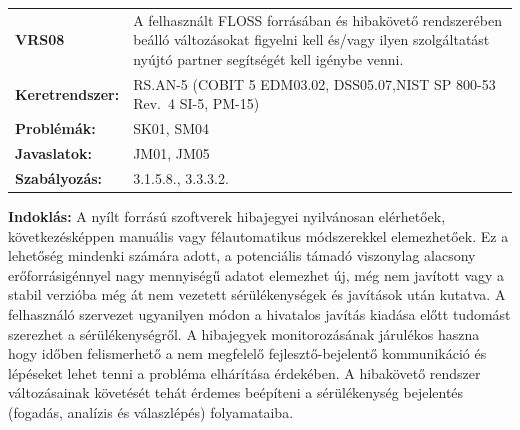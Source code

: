 \documentclass[12pt,magyar,a4paper,oneside]{scrreprt}
\begin{document}
\begin{longtable}[]{@{}ll@{}}
\toprule
\endhead
\begin{minipage}[t]{0.16\columnwidth}\raggedright
\textbf{VRS08}\strut
\end{minipage} & \begin{minipage}[t]{0.79\columnwidth}\raggedright
A felhasznált FLOSS forrásában és hibakövető rendszerében beálló
változásokat figyelni kell és/vagy ilyen szolgáltatást nyújtó partner
segítségét kell igénybe venni.\strut
\end{minipage}\tabularnewline
\begin{minipage}[t]{0.16\columnwidth}\raggedright
\textbf{Keretrendszer:}\strut
\end{minipage} & \begin{minipage}[t]{0.79\columnwidth}\raggedright
RS.AN-5 (COBIT 5 EDM03.02, DSS05.07,NIST SP 800-53 Rev.~4 SI-5,
PM-15)\strut
\end{minipage}\tabularnewline
\begin{minipage}[t]{0.16\columnwidth}\raggedright
\textbf{Problémák:}\strut
\end{minipage} & \begin{minipage}[t]{0.79\columnwidth}\raggedright
SK01, SM04\strut
\end{minipage}\tabularnewline
\begin{minipage}[t]{0.16\columnwidth}\raggedright
\textbf{Javaslatok:}\strut
\end{minipage} & \begin{minipage}[t]{0.79\columnwidth}\raggedright
JM01, JM05\strut
\end{minipage}\tabularnewline
\begin{minipage}[t]{0.16\columnwidth}\raggedright
\textbf{Szabályozás:}\strut
\end{minipage} & \begin{minipage}[t]{0.79\columnwidth}\raggedright
3.1.5.8., 3.3.3.2.\strut
\end{minipage}\tabularnewline
\bottomrule
\end{longtable}

\textbf{Indoklás: } A nyílt forrású szoftverek hibajegyei nyilvánosan
elérhetőek, következésképpen manuális vagy félautomatikus módszerekkel
elemezhetőek. Ez a lehetőség mindenki számára adott, a potenciális
támadó viszonylag alacsony erőforrásigénnyel nagy mennyiségű adatot
elemezhet új, még nem javított vagy a stabil verzióba még át nem
vezetett sérülékenységek és javítások után kutatva. A felhasználó
szervezet ugyanilyen módon a hivatalos javítás kiadása előtt tudomást
szerezhet a sérülékenységről. A hibajegyek monitorozásának járulékos
haszna hogy időben felismerhető a nem megfelelő fejlesztő-bejelentő
kommunikáció és lépéseket lehet tenni a probléma elhárítása érdekében. A
hibakövető rendszer változásainak követését tehát érdemes beépíteni a
sérülékenység bejelentés (fogadás, analízis és válaszlépés)
folyamataiba.
\end{document}
